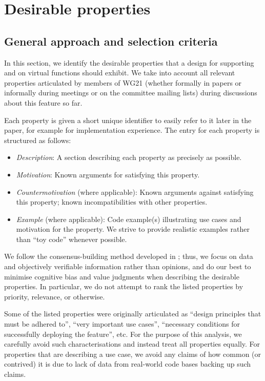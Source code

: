 \section{Desirable properties}
\label{properties}


\subsection{General approach and selection criteria}

In this section, we identify the desirable properties that a design for supporting  and  on virtual functions should exhibit. We take into account all relevant properties articulated by members of WG21 (whether formally in papers or informally during meetings or on the committee mailing lists)  during discussions about this feature so far.

Each property is given a short unique identifier to easily refer to it later in the paper, for example  for implementation experience. The entry for each property is structured as follows:
\begin{itemize}
\item \emph{Description}: A section describing each property as precisely as possible.
\item \emph{Motivation}: Known arguments for satisfying this property.
\item \emph{Countermotivation} (where applicable): Known arguments against satisfying this property; known incompatibilities with other properties.
\item \emph{Example} (where applicable): Code example(s) illustrating use cases and motivation for the property. We strive to provide realistic examples rather than ``toy code'' whenever possible. 
\end{itemize}
We follow the consensus-building method developed in \cite{P3099R0}; thus, we focus on data and objectively verifiable information rather than opinions, and do our best to minimise cognitive bias and value judgments when describing the desirable properties. In particular, we do not attempt to rank the listed properties by priority, relevance, or otherwise. 

Some of the listed properties were originally articulated as ``design principles that must be adhered to'',  ``very important use cases'', ``necessary conditions for successfully deploying the feature'', etc. For the purpose of this analysis, we carefully avoid such characterisations and instead treat all properties equally. For properties that are describing a use case, we avoid any claims of how common (or contrived) it is due to lack of data from real-world code bases backing up such claims.

